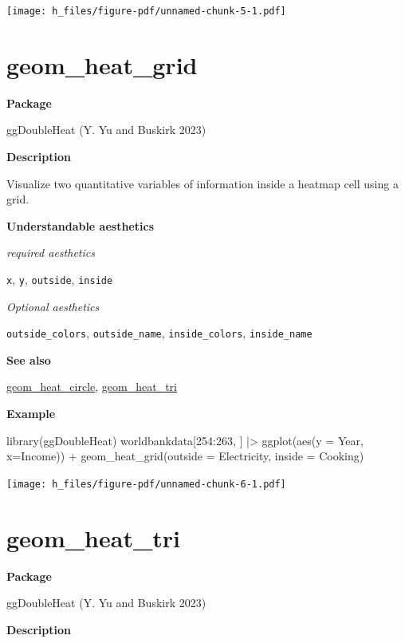 \documentclass[
  letterpaper,
  DIV=11,
  numbers=noendperiod]{scrreprt}
\newenvironment{Shaded}{\begin{snugshade}}{\end{snugshade}}
\newcommand{\AttributeTok}[1]{\textcolor[rgb]{0.40,0.45,0.13}{#1}}
\newcommand{\DecValTok}[1]{\textcolor[rgb]{0.68,0.00,0.00}{#1}}
\newcommand{\FunctionTok}[1]{\textcolor[rgb]{0.28,0.35,0.67}{#1}}
\newcommand{\NormalTok}[1]{\textcolor[rgb]{0.00,0.23,0.31}{#1}}
\newcommand{\SpecialCharTok}[1]{\textcolor[rgb]{0.37,0.37,0.37}{#1}}
\begin{document}
\texttt{[image: h\_files/figure-pdf/unnamed-chunk-5-1.pdf]}

\section{geom\_heat\_grid}\label{heat_grid}

\textbf{Package}

ggDoubleHeat (Y. Yu and Buskirk 2023)

\textbf{Description}

Visualize two quantitative variables of information inside a heatmap
cell using a grid.

\textbf{Understandable aesthetics}

\emph{required aesthetics}

\texttt{x}, \texttt{y}, \texttt{outside}, \texttt{inside}

\emph{Optional aesthetics}

\texttt{outside\_colors}, \texttt{outside\_name},
\texttt{inside\_colors}, \texttt{inside\_name}

\textbf{See also}

\hyperref[heat_circle]{geom\_heat\_circle},
\hyperref[heat_tri]{geom\_heat\_tri}

\textbf{Example}

\begin{Shaded}
\begin{Highlighting}[]
\FunctionTok{library}\NormalTok{(ggDoubleHeat)}
\NormalTok{worldbankdata[}\DecValTok{254}\SpecialCharTok{:}\DecValTok{263}\NormalTok{, ] }\SpecialCharTok{|\textgreater{}}
  \FunctionTok{ggplot}\NormalTok{(}\FunctionTok{aes}\NormalTok{(}\AttributeTok{y =}\NormalTok{ Year, }\AttributeTok{x=}\NormalTok{Income)) }\SpecialCharTok{+} 
  \FunctionTok{geom\_heat\_grid}\NormalTok{(}\AttributeTok{outside =}\NormalTok{ Electricity,}
           \AttributeTok{inside =}\NormalTok{ Cooking) }
\end{Highlighting}
\end{Shaded}

\texttt{[image: h\_files/figure-pdf/unnamed-chunk-6-1.pdf]}

\section{geom\_heat\_tri}\label{heat_tri}

\textbf{Package}

ggDoubleHeat (Y. Yu and Buskirk 2023)

\textbf{Description}
\end{document}
